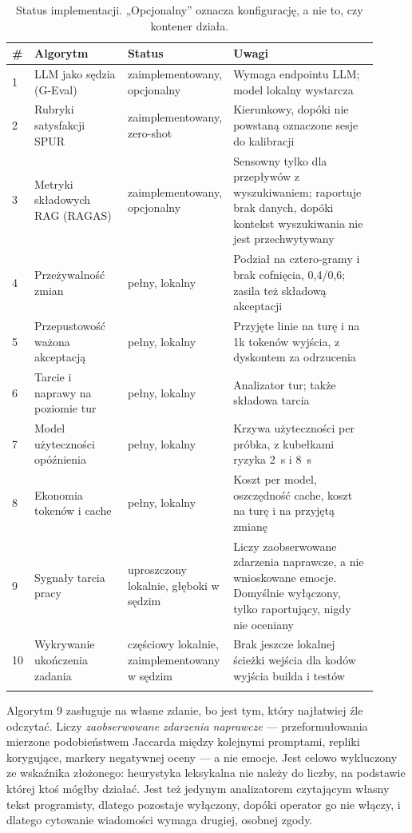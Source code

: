\documentclass[11pt,a4paper]{article}
\begin{document}
\begin{longtable}{@{}p{0.03\linewidth}p{0.26\linewidth}p{0.20\linewidth}p{0.42\linewidth}@{}}
\toprule
\textbf{\#} & \textbf{Algorytm} & \textbf{Status} & \textbf{Uwagi} \\
\midrule
\endhead
1 & LLM jako sędzia (G-Eval) & zaimplementowany, opcjonalny & Wymaga endpointu
LLM; model lokalny wystarcza \\
2 & Rubryki satysfakcji SPUR & zaimplementowany, zero-shot & Kierunkowy, dopóki
nie powstaną oznaczone sesje do kalibracji \\
3 & Metryki składowych RAG (RAGAS) & zaimplementowany, opcjonalny & Sensowny
tylko dla przepływów z wyszukiwaniem; raportuje brak danych, dopóki kontekst
wyszukiwania nie jest przechwytywany \\
4 & Przeżywalność zmian & pełny, lokalny & Podział na cztero-gramy i brak
cofnięcia, 0,4/0,6; zasila też składową akceptacji \\
5 & Przepustowość ważona akceptacją & pełny, lokalny & Przyjęte linie na turę i
na 1k tokenów wyjścia, z dyskontem za odrzucenia \\
6 & Tarcie i naprawy na poziomie tur & pełny, lokalny & Analizator tur; także
składowa tarcia \\
7 & Model użyteczności opóźnienia & pełny, lokalny & Krzywa użyteczności per
próbka, z kubełkami ryzyka 2~s i 8~s \\
8 & Ekonomia tokenów i cache & pełny, lokalny & Koszt per model, oszczędność
cache, koszt na turę i na przyjętą zmianę \\
9 & Sygnały tarcia pracy & uproszczony lokalnie, głęboki w sędzim & Liczy
zaobserwowane zdarzenia naprawcze, a nie wnioskowane emocje. Domyślnie
wyłączony, tylko raportujący, nigdy nie oceniany \\
10 & Wykrywanie ukończenia zadania & częściowy lokalnie, zaimplementowany w
sędzim & Brak jeszcze lokalnej ścieżki wejścia dla kodów wyjścia builda i
testów \\
\bottomrule
\caption{Status implementacji. „Opcjonalny'' oznacza konfigurację, a nie to,
czy kontener działa.}
\end{longtable}

Algorytm 9 zasługuje na własne zdanie, bo jest tym, który najłatwiej źle
odczytać. Liczy \emph{zaobserwowane zdarzenia naprawcze} --- przeformułowania
mierzone podobieństwem Jaccarda między kolejnymi promptami, repliki korygujące,
markery negatywnej oceny --- a nie emocje. Jest celowo wykluczony ze wskaźnika
złożonego: heurystyka leksykalna nie należy do liczby, na podstawie której ktoś
mógłby działać. Jest też jedynym analizatorem czytającym własny tekst
programisty, dlatego pozostaje wyłączony, dopóki operator go nie włączy, i
dlatego cytowanie wiadomości wymaga drugiej, osobnej zgody.
\end{document}
